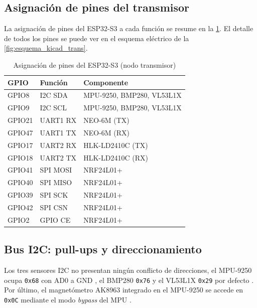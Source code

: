 \subsection{Asignación de pines del transmisor}
\label{sec:pines_tx}

La asignación de pines del ESP32-S3 a cada función se resume en la
\cref{tab:pines_tx}. El detalle de todos los pines se puede ver en el esquema eléctrico de la \cref{fig:esquema_kicad_trans}.

\begin{table}[H]
    \centering
    \caption{Asignación de pines del ESP32-S3 (nodo transmisor)}
    \label{tab:pines_tx}
    \footnotesize
    \begin{tabularx}{\linewidth}{l l X}
        \toprule
        \textbf{GPIO} & \textbf{Función} & \textbf{Componente} \\
        \midrule
        GPIO8  & I2C SDA   & MPU-9250, BMP280, VL53L1X \\
        GPIO9  & I2C SCL   & MPU-9250, BMP280, VL53L1X \\
        GPIO21 & UART1 RX  & NEO-6M (TX) \\
        GPIO47 & UART1 TX  & NEO-6M (RX) \\
        GPIO17 & UART2 RX  & HLK-LD2410C (TX) \\
        GPIO18 & UART2 TX  & HLK-LD2410C (RX) \\
        GPIO41 & SPI MOSI  & NRF24L01+ \\
        GPIO40 & SPI MISO  & NRF24L01+ \\
        GPIO39 & SPI SCK   & NRF24L01+ \\
        GPIO42 & SPI CSN   & NRF24L01+ \\
        GPIO2  & GPIO CE   & NRF24L01+ \\
        \bottomrule
    \end{tabularx}
\end{table}

\subsection{Bus I2C: pull-ups y direccionamiento}
\label{sec:bus_i2c}

Los tres sensores I2C no presentan ningún conflicto de direcciones, el MPU-9250 ocupa
\texttt{0x68} con AD0 a GND \cite{ps_mpu9250}, el BMP280 \texttt{0x76}
\cite{ds_bmp280} y el VL53L1X \texttt{0x29} por defecto \cite{ds_vl53l1x}. Por último, el
magnetómetro AK8963 integrado en el MPU-9250 se accede en \texttt{0x0C}
mediante el modo \textit{bypass} del MPU \cite{mpu9250_regmap}.

